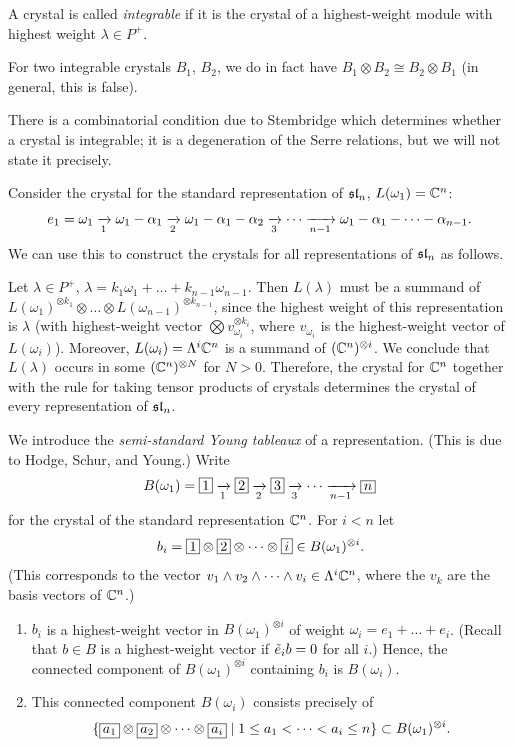\begin{definition}
A crystal is called \emph{integrable} if it is the crystal of a highest-weight
module with highest weight $\lambda \in P^+$.
\end{definition}

For two integrable crystals $B_1$, $B_2$, we do in fact have
$B_1 \otimes B_2 \cong B_2 \otimes B_1$ (in general, this is false).

\begin{remark}
There is a combinatorial condition due to Stembridge which determines whether a
crystal is integrable; it is a degeneration of the Serre relations, but we will
not state it precisely.
\end{remark}

 Consider the crystal for the standard representation of $\sl_n$,
$L(\omega_1) = \C^n$:
\[
  e_1 = \omega_1 \xto{1} \omega_1 - \alpha_1 \xto{2} \omega_1 - \alpha_1 - \alpha_2
  \xto{3} \cdots \xto{n-1} \omega_1 - \alpha_1 - \dots - \alpha_{n-1}.
\]
We can use this to construct the crystals for all representations of $\sl_n$
as follows.

Let $\lambda \in P^+$, $\lambda = k_1\omega_1 + \dots + k_{n-1}\omega_{n-1}$.
Then $L(\lambda)$ must be a summand of
$L(\omega_1)^{\otimes k_1} \otimes \dots \otimes L(\omega_{n-1})^{\otimes k_{n-1}}$,
since the highest weight of this representation is $\lambda$ (with
highest-weight vector $\bigotimes v_{\omega_i}^{\otimes k_i}$, where
$v_{\omega_i}$ is the highest-weight vector of $L(\omega_i)$). Moreover,
$L(\omega_i) = \Lambda^i\C^n$ is a summand of $(\C^n)^{\otimes i}$. We
conclude that $L(\lambda)$ occurs in some $(\C^n)^{\otimes N}$ for $N > 0$.
Therefore, the crystal for $\C^n$ together with the rule for taking tensor
products of crystals determines the crystal of every representation of
$\sl_n$.

We introduce the \emph{semi-standard Young tableaux} of a representation. (This
is due to Hodge, Schur, and Young.) Write
\[
  B(\omega_1) = \bx{1} \xto{1} \bx{2} \xto{2} \bx{3} \xto{3} \cdots \xto{n-1} \bx{n}
\]
for the crystal of the standard representation $\C^n$. For $i < n$ let
\[
  b_i = \bx{1} \otimes \bx{2} \otimes \dots \otimes \bx{i} \in B(\omega_1)^{\otimes i}.
\]
(This corresponds to the vector $v_1 \wedge v_2 \wedge \dots \wedge v_i \in \Lambda^i\C^n$,
where the $v_k$ are the basis vectors of $\C^n$.)

\begin{exercise}\leavevmode
\begin{enumerate}
  \item $b_i$ is a highest-weight vector in $B(\omega_1)^{\otimes i}$ of weight
    $\omega_i = e_1 + \dots + e_i$. (Recall that $b \in B$ is a
    highest-weight vector if $\te_ib = 0$ for all $i$.) Hence, the connected
    component of $B(\omega_1)^{\otimes i}$ containing $b_i$ is $B(\omega_i)$.
  \item This connected component $B(\omega_i)$ consists precisely of
    \[
      \setc{\bx{a_1} \otimes \bx{a_2} \otimes \dots \otimes \bx{a_i}}{1 \leq a_1 < \dots < a_i \leq n}
        \subset B(\omega_1)^{\otimes i}.
    \]
\end{enumerate}
\end{exercise}

